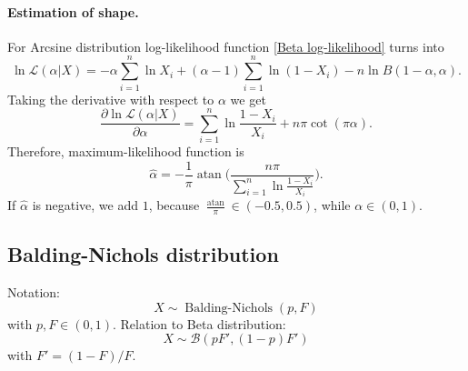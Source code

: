 \documentclass[a4paper,11pt]{article}
\theoremstyle{plain}
\theoremstyle{definition}
\begin{document}
	\paragraph{Estimation of shape.} For Arcsine distribution log-likelihood function \eqref{Beta log-likelihood} turns into
	\[
	\ln \mathcal{L} (\alpha | X) = -\alpha \sum_{i=1}^{n} \ln X_i + (\alpha - 1) \sum_{i=1}^{n}\ln (1-X_i) - n \ln B(1-\alpha, \alpha).
	\]
	Taking the derivative with respect to $\alpha$ we get
	\[ 
	\frac{\partial \ln\mathcal{L}(\alpha | X)}{\partial \alpha} = \sum_{i=1}^{n} \ln \frac{1-X_i}{X_i} + n\pi \cot(\pi \alpha).
	\]
	Therefore, maximum-likelihood function is
	\[ \hat{\alpha} = -\frac{1}{\pi} \operatorname{atan}\Bigg(\frac{n\pi}{\sum_{i=1}^{n} \ln \frac{1-X_i}{X_i}}\Bigg). \]
	If $\hat{\alpha}$ is negative, we add $1$, because $\frac{\operatorname{atan}}{\pi} \in (-0.5, 0.5)$, while $\alpha \in (0, 1)$.
	
	\subsection{Balding-Nichols distribution}
	Notation: \[ X \sim \operatorname{Balding-Nichols}(p, F) \] with $p, F \in (0, 1)$.
	Relation to Beta distribution: \[ X \sim \mathcal{B}(pF', (1 - p)F') \] with $F' = (1 - F) / F$.
	
\end{document}
